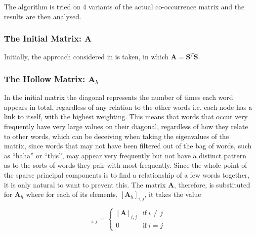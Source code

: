 \documentclass[graybox]{svmult}
\begin{document}
The algorithm is tried on 4 variants of the actual co-occurrence matrix and the results are then analysed. 


\subsubsection{The Initial Matrix: $\mathbf{A}$}
Initially, the approach considered in \cite{dimakis} is taken, in which $\mathbf{A} = \mathbf{S}^T \mathbf{S}$.


  
\subsubsection{The Hollow Matrix: $\mathbf{A}_{h}$}

In the initial matrix the diagonal represents the number of times each word appears in total, regardless of any relation to the other words i.e. each node has a link to itself, with the highest weighting. This means that words that occur very frequently have very large values on their diagonal, regardless of how they relate to other words, which can be deceiving when taking the eigenvalues of the matrix, since words that may not have been filtered out of the bag of words, such as ``haha'' or ``this'', may appear very frequently but not have a distinct pattern as to the sorts of words they pair with most frequently. Since the whole point of the sparse principal components is to find a relationship of a few words together, it is only natural to want to prevent this. The matrix $\mathbf{A}$, therefore, is substituted for 
$\mathbf{A}_h$ where for each of its elements, $[\mathbf{A}_h]_{i, j}$, it takes the value 

\begin{equation}
[\mathbf{A}_h]_{i, j}= 
\begin{cases}
[\mathbf{A}]_{i, j} & \text{if}\ i \neq j\\
0 & \text{if}\ i = j
\end{cases}
\end{equation}
\begin{comment}
In this case, the second sparse PC once again does not represent any significant occasion and seems to just be a few words that may occur frequently together or separately. Contrary to the previous case though, the first sparse PC refers to a very specific event regarding a murder that took place on the 19th September 2012, where 2 police officers were killed and which resulted in a trending topic on Twitter. 

What is useful to note is that in the case of the first PC 7 of the 8 words rank much lower than the top 20 words, the lowest one occurring merely 34 times and the highest appearing 485 times, which is comparable to the lowest in the previous case. This clearly highlights the positive effect of removing the link of the each vertex to itself, which allows the algorithm to discover relationships which would otherwise be completely overpowered. 

\end{comment}
\end{document}
